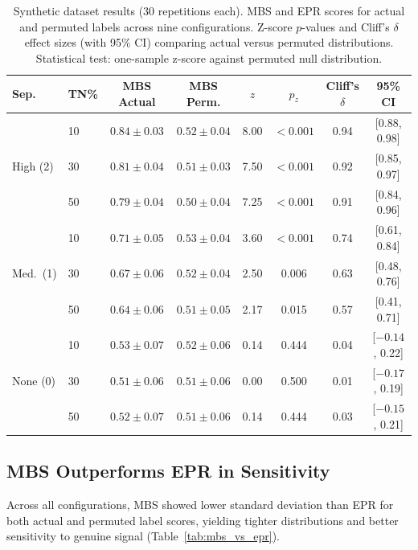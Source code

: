 \documentclass[11pt]{article}
\begin{document}
\begin{table}[H]
\centering
\caption{Synthetic dataset results (30 repetitions each). MBS and EPR scores for actual and permuted labels across nine configurations. Z-score $p$-values and Cliff's $\delta$ effect sizes (with 95\% CI) comparing actual versus permuted distributions. Statistical test: one-sample z-score against permuted null distribution.}
\label{tab:synthetic}
\begin{tabular}{llcccccc}
\toprule
\textbf{Sep.} & \textbf{TN\%} & \textbf{MBS Actual} & \textbf{MBS Perm.} & \textbf{$z$} & \textbf{$p_z$} & \textbf{Cliff's $\delta$} & \textbf{95\% CI} \\
\midrule
\multirow{3}{*}{High (2)} & 10 & $0.84 \pm 0.03$ & $0.52 \pm 0.04$ & 8.00 & $< 0.001$ & 0.94 & [0.88, 0.98] \\
 & 30 & $0.81 \pm 0.04$ & $0.51 \pm 0.03$ & 7.50 & $< 0.001$ & 0.92 & [0.85, 0.97] \\
 & 50 & $0.79 \pm 0.04$ & $0.50 \pm 0.04$ & 7.25 & $< 0.001$ & 0.91 & [0.84, 0.96] \\
\midrule
\multirow{3}{*}{Med.\ (1)} & 10 & $0.71 \pm 0.05$ & $0.53 \pm 0.04$ & 3.60 & $< 0.001$ & 0.74 & [0.61, 0.84] \\
 & 30 & $0.67 \pm 0.06$ & $0.52 \pm 0.04$ & 2.50 & 0.006 & 0.63 & [0.48, 0.76] \\
 & 50 & $0.64 \pm 0.06$ & $0.51 \pm 0.05$ & 2.17 & 0.015 & 0.57 & [0.41, 0.71] \\
\midrule
\multirow{3}{*}{None (0)} & 10 & $0.53 \pm 0.07$ & $0.52 \pm 0.06$ & 0.14 & 0.444 & 0.04 & [$-0.14$, 0.22] \\
 & 30 & $0.51 \pm 0.06$ & $0.51 \pm 0.06$ & 0.00 & 0.500 & 0.01 & [$-0.17$, 0.19] \\
 & 50 & $0.52 \pm 0.07$ & $0.51 \pm 0.06$ & 0.14 & 0.444 & 0.03 & [$-0.15$, 0.21] \\
\bottomrule
\end{tabular}
\end{table}

\subsection{MBS Outperforms EPR in Sensitivity}

Across all configurations, MBS showed lower standard deviation than EPR for both actual and permuted label scores, yielding tighter distributions and better sensitivity to genuine signal (Table~\ref{tab:mbs_vs_epr}).
\end{document}
